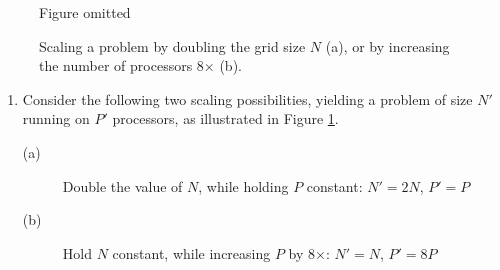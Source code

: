 \documentclass[11pt]{article}
\begin{document}
\begin{figure}
\begin{center}
Figure omitted
\end{center}
\caption{Scaling a problem by doubling the grid size $N$ (a), or by increasing the number of processors  8$\times$ (b).}
\label{fig:scale}
\end{figure}

\begin{enumerate}
\item Consider the following two scaling possibilities, yielding a problem of size $N'$
  running on $P'$ processors, as illustrated in Figure \ref{fig:scale}.
\begin{description}
\item[(a)] Double the value of $N$, while holding $P$ constant:  $N' = 2N$, $P' = P$
\item[(b)] Hold $N$ constant, while increasing $P$ by 8$\times$: $N' = N$, $P' = 8P$
\end{description}


\end{enumerate}
\end{document}
